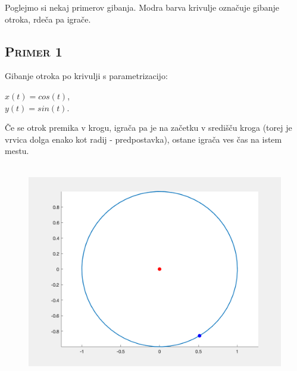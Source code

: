 \documentclass[a4paper,12pt]{article}
\begin{document}
Poglejmo si nekaj primerov gibanja. Modra barva krivulje označuje gibanje otroka, rdeča pa igrače.

\subsection{\textsc{Primer 1}}
    
     Gibanje otroka po krivulji s parametrizacijo:
    \begin{center}
    $x(t) = cos(t)$, \\
    $y(t) = sin(t)$. 
    \end{center}
    Če se otrok premika v krogu, igrača pa je na začetku v središču kroga (torej je vrvica dolga enako kot radij - predpostavka), ostane igrača ves čas na istem mestu.
    \\
    \\
    \begin{figure}[!h]
        \centering
        \includegraphics[scale=0.4]{Primer1}
    \end{figure}

    \newpage
\end{document}
